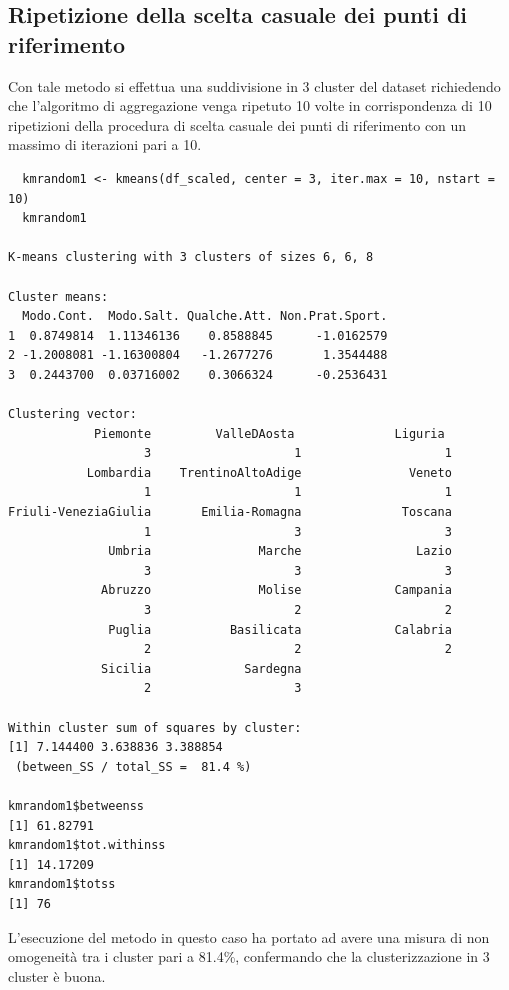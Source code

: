 \subsection{Ripetizione della scelta casuale dei punti di riferimento}\label{cap5.3.2}

Con tale metodo si effettua una suddivisione in 3 cluster del dataset richiedendo che l'algoritmo di aggregazione venga ripetuto 10 volte in corrispondenza di 10 ripetizioni della procedura di scelta casuale dei punti di riferimento con un massimo di iterazioni pari a 10.

\vspace{5mm}
\begin{lstlisting}
  kmrandom1 <- kmeans(df_scaled, center = 3, iter.max = 10, nstart = 10)
  kmrandom1

K-means clustering with 3 clusters of sizes 6, 6, 8

Cluster means:
  Modo.Cont.  Modo.Salt. Qualche.Att. Non.Prat.Sport.
1  0.8749814  1.11346136    0.8588845      -1.0162579
2 -1.2008081 -1.16300804   -1.2677276       1.3544488
3  0.2443700  0.03716002    0.3066324      -0.2536431

Clustering vector:
            Piemonte         ValleDAosta              Liguria 
                   3                    1                    1 
           Lombardia    TrentinoAltoAdige               Veneto 
                   1                    1                    1 
Friuli-VeneziaGiulia       Emilia-Romagna              Toscana 
                   1                    3                    3 
              Umbria               Marche                Lazio 
                   3                    3                    3 
             Abruzzo               Molise             Campania 
                   3                    2                    2 
              Puglia           Basilicata             Calabria 
                   2                    2                    2 
             Sicilia             Sardegna 
                   2                    3 

Within cluster sum of squares by cluster:
[1] 7.144400 3.638836 3.388854
 (between_SS / total_SS =  81.4 %)  

kmrandom1$betweenss
[1] 61.82791
kmrandom1$tot.withinss
[1] 14.17209
kmrandom1$totss
[1] 76
\end{lstlisting}
\vspace{5mm}

L'esecuzione del metodo in questo caso ha portato ad avere una misura di non omogeneità tra i cluster pari a 81.4\%, confermando che la clusterizzazione in 3 cluster è buona.


